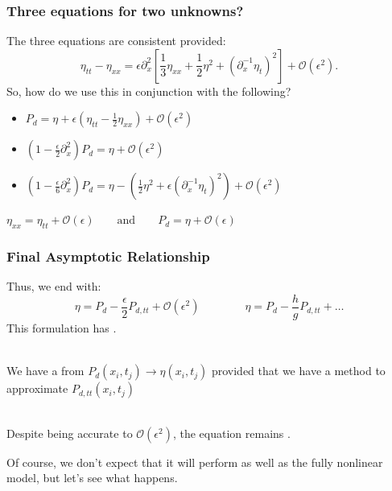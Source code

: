 

\begin{frame}[t]\frametitle{Three equations for two unknowns? }
    The three equations are consistent provided: 
    \[\eta_{tt} - \eta_{xx} = \epsilon\partial_x^2\left[\frac{1}{3}\eta_{xx} + \frac{1}{2}\eta^2 + \left(\partial_x^{-1}\eta_t\right)^2\right] + \mathcal{O}(\epsilon^2).\]
\pause
So, how do we use this in conjunction with the following?
    \begin{itemize}
        \item[] \(\displaystyle P_d = \eta + \epsilon\left(\eta_{tt} -\frac{1}{2}\eta_{xx}\right) + \mathcal{O}(\epsilon^2)\)\\
        \item[] \(\displaystyle \left(1 - \frac{\epsilon}{2}\partial_x^2\right)P_d = \eta + \mathcal{O}(\epsilon^2)\)\\
        \item[] \(\displaystyle \left(1 - \frac{\epsilon}{6}\partial_x^2\right)P_d = \eta - \left(\frac{1}{2}\eta^2 + \epsilon\left(\partial_x^{-1}\eta_t\right)^2\right) + \mathcal{O}(\epsilon^2)\)\\
    \end{itemize}
\pause
\vfill

 \(\eta_{xx} = \eta_{tt} + \mathcal{O}(\epsilon) \qquad \text{and}\qquad P_d = \eta + \mathcal{O}(\epsilon)\)

\end{frame}



\begin{frame}[t]\frametitle{Final Asymptotic Relationship}
    Thus, we end with:
    \[\eta = P_d - \frac{\epsilon}{2}P_{d,tt} + \mathcal{O}(\epsilon^2) \qquad \qquad \eta = P_d - \frac{h}{g}P_{d,tt} + \ldots\]
    \pause
    \vfill
    This formulation has .  \\~\\ \pause
    
    We have a  from \(P_d(x_i,t_j) \to \eta(x_i,t_j)\) provided that we have a method to approximate \(P_{d,tt}(x_i,t_j)\)\\~\\ \pause
    
    Despite being accurate to $\mathcal{O}(\epsilon^2)$, the equation remains . \pause
    \vfill

    Of course, we don't expect that it will perform as well as the fully nonlinear model, but let's see what happens.
\end{frame}
